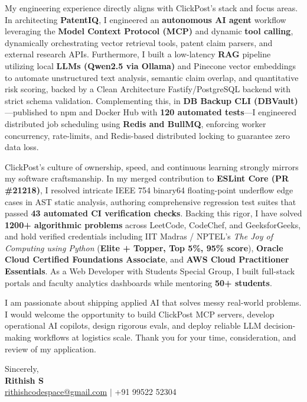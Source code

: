 \documentclass[letterpaper,11pt]{article}
\begin{document}
My engineering experience directly aligns with ClickPost's stack and focus areas. In architecting \textbf{PatentIQ}, I engineered an \textbf{autonomous AI agent} workflow leveraging the \textbf{Model Context Protocol (MCP)} and dynamic \textbf{tool calling}, dynamically orchestrating vector retrieval tools, patent claim parsers, and external research APIs. Furthermore, I built a low-latency \textbf{RAG} pipeline utilizing local \textbf{LLMs (Qwen2.5 via Ollama)} and Pinecone vector embeddings to automate unstructured text analysis, semantic claim overlap, and quantitative risk scoring, backed by a Clean Architecture Fastify/PostgreSQL backend with strict schema validation. Complementing this, in \textbf{DB Backup CLI (DBVault)}---published to npm and Docker Hub with \textbf{120 automated tests}---I engineered distributed job scheduling using \textbf{Redis and BullMQ}, enforcing worker concurrency, rate-limits, and Redis-based distributed locking to guarantee zero data loss.

ClickPost's culture of ownership, speed, and continuous learning strongly mirrors my software craftsmanship. In my merged contribution to \textbf{ESLint Core (PR \#21218)}, I resolved intricate IEEE 754 binary64 floating-point underflow edge cases in AST static analysis, authoring comprehensive regression test suites that passed \textbf{43 automated CI verification checks}. Backing this rigor, I have solved \textbf{1200+ algorithmic problems} across LeetCode, CodeChef, and GeeksforGeeks, and hold verified credentials including IIT Madras / NPTEL's \textit{The Joy of Computing using Python} (\textbf{Elite + Topper, Top 5\%, 95\% score}), \textbf{Oracle Cloud Certified Foundations Associate}, and \textbf{AWS Cloud Practitioner Essentials}. As a Web Developer with Students Special Group, I built full-stack portals and faculty analytics dashboards while mentoring \textbf{50+ students}.

I am passionate about shipping applied AI that solves messy real-world problems. I would welcome the opportunity to build ClickPost MCP servers, develop operational AI copilots, design rigorous evals, and deploy reliable LLM decision-making workflows at logistics scale. Thank you for your time, consideration, and review of my application.

\vspace{10pt}
Sincerely, \\ \vspace{2pt}
\textbf{Rithish S} \\
\href{mailto:rithishcodespace@gmail.com}{rithishcodespace@gmail.com} $|$ +91 99522 52304
\end{document}
